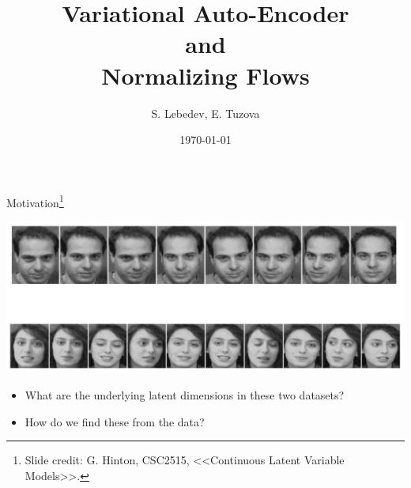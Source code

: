 \documentclass[unicode,11pt]{beamer}
\title{Variational Auto-Encoder \\
  and \\
  Normalizing Flows}
\author{S. Lebedev, E. Tuzova}
\institute{JetBrains}
\date{\today}
\begin{document}
\begin{frame}
  \maketitle
\end{frame}


\begin{frame}{Motivation\footnote{Slide credit: G. Hinton, CSC2515, <<Continuous
      Latent Variable Models>>.}}
  \begin{center}
    \includegraphics[width=.8\textwidth]{images/motivation}
  \end{center}

  \begin{itemize}
  \item What are the underlying latent dimensions in these two datasets?
  \item How do we find these from the data?
  \end{itemize}
\end{frame}
\end{document}
